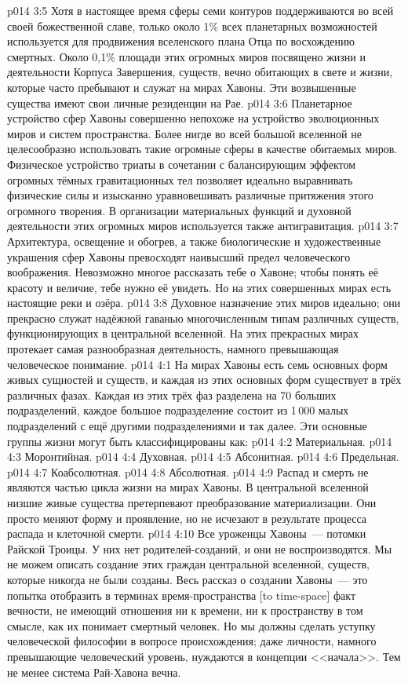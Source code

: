 \vs p014 3:5 Хотя в настоящее время сферы семи контуров поддерживаются во всей своей божественной славе, только около 1\% всех планетарных возможностей используется для продвижения вселенского плана Отца по восхождению смертных. Около 0,1\% площади этих огромных миров посвящено жизни и деятельности Корпуса Завершения, существ, вечно обитающих в свете и жизни, которые часто пребывают и служат на мирах Хавоны. Эти возвышенные существа имеют свои личные резиденции на Рае.
\vs p014 3:6 Планетарное устройство сфер Хавоны совершенно непохоже на устройство эволюционных миров и систем пространства. Более нигде во всей большой вселенной не целесообразно использовать такие огромные сферы в качестве обитаемых миров. Физическое устройство триаты в сочетании с балансирующим эффектом огромных тёмных гравитационных тел позволяет идеально выравнивать физические силы и изысканно уравновешивать различные притяжения этого огромного творения. В организации материальных функций и духовной деятельности этих огромных миров используется также антигравитация.
\vs p014 3:7 Архитектура, освещение и обогрев, а также биологические и художественные украшения сфер Хавоны превосходят наивысший предел человеческого воображения. Невозможно многое рассказать тебе о Хавоне; чтобы понять её красоту и величие, тебе нужно её увидеть. Но на этих совершенных мирах есть настоящие реки и озёра.
\vs p014 3:8 Духовное назначение этих миров идеально; они прекрасно служат надёжной гаванью многочисленным типам различных существ, функционирующих в центральной вселенной. На этих прекрасных мирах протекает самая разнообразная деятельность, намного превышающая человеческое понимание.
\vs p014 4:1 На мирах Хавоны есть семь основных форм живых сущностей и существ, и каждая из этих основных форм существует в трёх различных фазах. Каждая из этих трёх фаз разделена на 70 больших подразделений, каждое большое подразделение состоит из 1\,000 малых подразделений с ещё другими подразделениями и так далее. Эти основные группы жизни могут быть классифицированы как:
\vs p014 4:2 Материальная.
\vs p014 4:3 Моронтийная.
\vs p014 4:4 Духовная.
\vs p014 4:5 Абсонитная.
\vs p014 4:6 Предельная.
\vs p014 4:7 Коабсолютная.
\vs p014 4:8 Абсолютная.
\vs p014 4:9 \pc Распад и смерть не являются частью цикла жизни на мирах Хавоны. В центральной вселенной низшие живые существа претерпевают преобразование материализации. Они просто меняют форму и проявление, но не исчезают в результате процесса распада и клеточной смерти.
\vs p014 4:10 \pc Все уроженцы Хавоны~--- потомки Райской Троицы. У них нет родителей\hyp{}созданий, и они не воспроизводятся. Мы не можем описать создание этих граждан центральной вселенной, существ, которые никогда не были созданы. Весь рассказ о создании Хавоны~--- это попытка отобразить в терминах время\hyp{}пространства [to time\hyp{}space] факт вечности, не имеющий отношения ни к времени, ни к пространству в том смысле, как их понимает смертный человек. Но мы должны сделать уступку человеческой философии в вопросе происхождения; даже личности, намного превышающие человеческий уровень, нуждаются в концепции <<начала>>. Тем не менее система Рай\hyp{}Хавона вечна.
